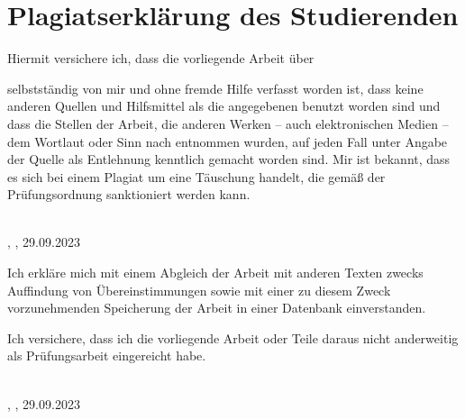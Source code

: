 \chapter*{Plagiatserklärung des Studierenden}
Hiermit versichere ich, dass die vorliegende Arbeit über 
\begin{center}
\textit{\printtitle}
\end{center}
selbstständig von mir und ohne fremde Hilfe verfasst worden ist, dass keine anderen Quellen und Hilfsmittel als die angegebenen benutzt worden sind und dass die Stellen der Arbeit, die anderen Werken – auch elektronischen Medien – dem Wortlaut oder Sinn nach entnommen wurden, auf jeden Fall unter Angabe der Quelle als Entlehnung kenntlich gemacht worden sind. Mir ist bekannt, dass es sich bei einem Plagiat um eine Täuschung handelt, die gemäß der Prüfungsordnung sanktioniert werden kann.

\vspace{0.75cm}
\parbox{17em}{\hrulefill} \\
\printname, \printcity, 29.09.2023 \\
\vspace{0.5cm}



Ich erkläre mich mit einem Abgleich der Arbeit mit anderen Texten zwecks Auffindung von Übereinstimmungen sowie mit einer zu diesem Zweck vorzunehmenden Speicherung der Arbeit in einer Datenbank einverstanden. 

Ich versichere, dass ich die vorliegende Arbeit oder Teile daraus nicht anderweitig als Prüfungsarbeit eingereicht habe.



\vspace{0.75cm}
\parbox{17em}{\hrulefill} \\
\printname, \printcity, 29.09.2023


